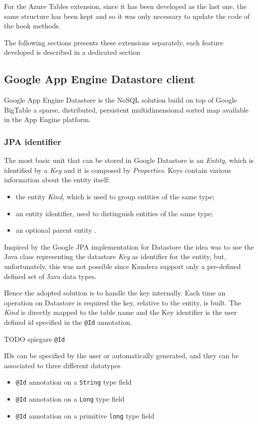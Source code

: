 \noindent For the Azure Tables extension, since it has been developed as the last one, the same structure has been kept and so it was only necessary to update the code of the hook methods.

\noindent The following sections presents these extensions separately, each feature developed is described in a dedicated section

\subsection{Google App Engine Datastore client}
\label{sec:kundera-datastore}
Google App Engine Datastore \cite{online:datastore} is the NoSQL solution build on top of Google BigTable a sparse, distributed, persistent multidimensional sorted map available in the App Engine platform. 

\subsubsection{JPA identifier}
The most basic unit that can be stored in Google Datastore is an \textit{Entity}, which is identified by a \textit{Key} and it is composed by \textit{Properties}.
Keys contain various information about the entity itself:
\begin{itemize}
\item the entity \textit{Kind}, which is used to group entities of the same type;
\item an entity identifier, used to distinguish entities of the same type;
\item an optional parent entity .
\end{itemize}
Inspired by the Google JPA implementation for Datastore \cite{online:googlejpa} the idea was to use the Java class representing the datastore \textit{Key} as identifier for the entity, but, unfortunately, this was not possible since Kundera support only a pre-defined defined set of Java data types.

\noindent Hence the adopted solution is to handle the key internally. Each time an operation on Datastore is required the key, relative to the entity, is built. The \textit{Kind} is directly mapped to the table name and the Key identifier is the user defined id specified in the \texttt{@Id} annotation.

\newparagraph TODO spiegare \texttt{@Id} 

\newparagraph IDs can be specified by the user or automatically generated, and they can be associated to three different datatypes
\begin{itemize}
\item \texttt{@Id} annotation on a \texttt{String} type field
\item \texttt{@Id} annotation on a \texttt{Long} type field
\item \texttt{@Id} annotation on a primitive \texttt{long} type field
\end{itemize}

